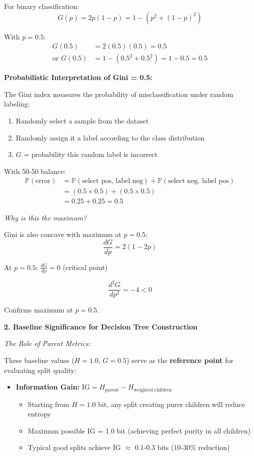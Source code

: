 \documentclass[12pt]{article}
\begin{document}
\begin{explanation}
For binary classification:
\[
G(p) = 2p(1-p) = 1 - (p^2 + (1-p)^2)
\]

With $p = 0.5$:
\begin{align*}
G(0.5) &= 2(0.5)(0.5) = 0.5 \\
\text{or } G(0.5) &= 1 - (0.5^2 + 0.5^2) = 1 - 0.5 = 0.5
\end{align*}

\textbf{Probabilistic Interpretation of Gini = 0.5:}

The Gini index measures the probability of misclassification under random labeling:
\begin{enumerate}
    \item Randomly select a sample from the dataset
    \item Randomly assign it a label according to the class distribution
    \item $G$ = probability this random label is incorrect
\end{enumerate}

With 50-50 balance:
\begin{align*}
\mathbb{P}(\text{error}) &= \mathbb{P}(\text{select pos, label neg}) + \mathbb{P}(\text{select neg, label pos}) \\
&= (0.5 \times 0.5) + (0.5 \times 0.5) \\
&= 0.25 + 0.25 = 0.5
\end{align*}

\textit{Why is this the maximum?}

Gini is also concave with maximum at $p = 0.5$:
\[
\frac{dG}{dp} = 2(1 - 2p)
\]

At $p = 0.5$: $\frac{dG}{dp} = 0$ (critical point)

\[
\frac{d^2G}{dp^2} = -4 < 0
\]

Confirms maximum at $p = 0.5$.

\textbf{2. Baseline Significance for Decision Tree Construction}

\textit{The Role of Parent Metrics:}

These baseline values ($H = 1.0$, $G = 0.5$) serve as the \textbf{reference point} for evaluating split quality:

\begin{itemize}
    \item \textbf{Information Gain:} $\text{IG} = H_{\text{parent}} - H_{\text{weighted children}}$
    \begin{itemize}
        \item Starting from $H = 1.0$ bit, any split creating purer children will reduce entropy
        \item Maximum possible IG = 1.0 bit (achieving perfect purity in all children)
        \item Typical good splits achieve IG $\approx$ 0.1-0.3 bits (10-30\% reduction)
    \end{itemize}


\end{itemize}
\end{explanation}
\end{document}
